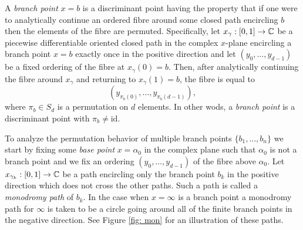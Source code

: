 A {\it branch point} $x=b$ is a discriminant point having the property that if
one were to analytically continue an ordered fibre around some closed path
encircling $b$ then the elements of the fibre are permuted. Specifically, let
$x_{\gamma} : [0,1] \to \operatorname{\mathbb{C}}$ be a piecewise differentiable oriented closed path
in the complex $x$-plane encircling a branch point $x=b$ exactly once in the
positive direction and let $(y_0,\ldots,y_{d-1})$ be a fixed ordering of the
fibre at $x_\gamma(0) = b$. Then, after analytically continuing the fibre around
$x_\gamma$ and returning to $x_\gamma(1) = b$, the fibre is equal to
\[
    (y_{\pi_b(0)}, \ldots, y_{\pi_b(d-1)}),
\]
where $\pi_b \in S_d$ is a permutation on $d$ elements. In other wods, a
{\it branch point} is a discriminant point with $\pi_b \neq \text{id}$.

To analyze the permutation behavior of multiple branch points
$\{b_1,\ldots,b_n\}$ we start by fixing some {\it base point} $x=\alpha_0$ in
the complex plane such that $\alpha_0$ is not a branch point and we fix an
ordering $(y_0,\ldots,y_{d-1})$ of the fibre above $\alpha_0$. Let $x_{\gamma_k}
: [0,1] \to \operatorname{\mathbb{C}}$ be a path encircling only the branch point $b_k$ in the
positive direction which does not cross the other paths. Such a path is called a
{\it monodromy path} of $b_k$. In the case when $x = \infty$ is a branch point a
monodromy path for $\infty$ is taken to be a circle going around all of the
finite branch points in the negative direction. See Figure \ref{fig: mon} for an
illustration of these paths.

